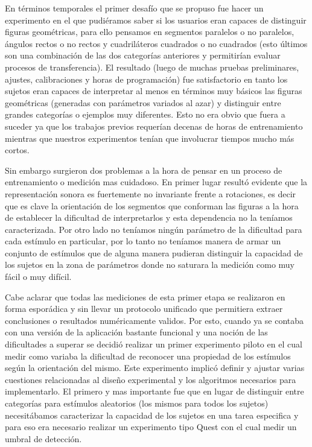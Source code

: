 \documentclass{article}
\begin{document}
    En términos temporales el primer desafío que se propuso fue hacer un experimento en el que pudiéramos saber si los usuarios eran capaces de distinguir figuras geométricas, para ello pensamos en segmentos paralelos o no paralelos, ángulos rectos o no rectos y cuadriláteros cuadrados o no cuadrados (esto últimos son una combinación de las dos categorías anteriores y permitirían evaluar procesos de transferencia). El resultado (luego de muchas pruebas preliminares, ajustes, calibraciones y horas de programación) fue satisfactorio en tanto los sujetos eran capaces de interpretar al menos en términos muy básicos las figuras geométricas (generadas con parámetros variados al azar) y distinguir entre grandes categorías o ejemplos muy diferentes. Esto no era obvio que fuera a suceder ya que los trabajos previos requerían decenas de horas de entrenamiento mientras que nuestros experimentos tenían que involucrar tiempos mucho más cortos.
    
    Sin embargo surgieron dos problemas a la hora de pensar en un proceso de entrenamiento o medición mas cuidadoso. En primer lugar resultó evidente que la representación sonora es fuertemente no invariante frente a rotaciones, es decir que es clave la orientación de los segmentos que conforman las figuras a la hora de establecer la dificultad de interpretarlos y esta dependencia no la teníamos caracterizada. Por otro lado no teníamos ningún parámetro de la dificultad para cada estímulo en particular, por lo tanto no teníamos manera de armar un conjunto de estímulos que de alguna manera pudieran distinguir la capacidad de los sujetos en la zona de parámetros donde no saturara la medición como muy fácil o muy difícil. 
    
    Cabe aclarar que todas las mediciones de esta primer etapa se realizaron en forma esporádica y sin llevar un protocolo unificado que permitiera extraer conclusiones o resultados numéricamente validos. Por esto, cuando ya se contaba con una versión de la aplicación bastante funcional y una noción de las dificultades a superar se decidió realizar un primer experimento piloto en el cual medir como variaba la dificultad de reconocer una propiedad de los estímulos según la orientación del mismo. Este experimento implicó definir y ajustar varias cuestiones relacionadas al diseño experimental y los algoritmos necesarios para implementarlo. El primero y mas importante fue que en lugar de distinguir entre categorías para estímulos aleatorios (los mismos para todos los sujetos) necesitábamos caracterizar la capacidad de los sujetos en una tarea especifica y para eso era necesario realizar un experimento tipo Quest con el cual medir un umbral de detección. 
    
\end{document}
